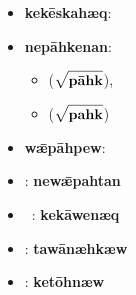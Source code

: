 \begin{assgts}
\item \begin{itemize}
\item \textbf{kekēskahæq}: \yumi\ \kekEskaeq {\mezah}
\item \textbf{nepāhkenan}:
\begin{itemize}
\item \mi\nepAhkarn {\mezen} ($\sqrt{\mbox{\tallstrut \textbf{pāhk}}}$),
\item \mi\nepAhkaln {\mezen} ($\sqrt{\mbox{\tallstrut \textbf{pahk}}}$)
\end{itemize}
\item \textbf{wǣpāhpew}: \ta\wAEpAhpew
\end{itemize}
\item \begin{itemize}\setlength{\itemsep}{0pt}
\item \mi\newAEpahtan: \textbf{newǣpahtan}
\item \yumi\ \kekAwaeq {\mezen}: \textbf{kekāwenæq}
\item \ta\tawAnaehkaew: \textbf{tawānæhkæw}
\item \ta\ketOhnaew: \textbf{ketōhnæw}
\end{itemize}
\end{assgts}

